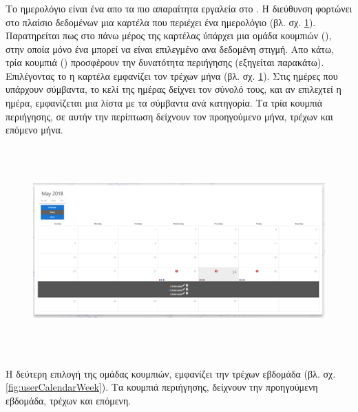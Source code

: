 \subsubsection*{}
\pSpace Το ημερολόγιο είναι ένα απο τα πιο απαραίτητα εργαλεία στο . Η διεύθυνση  φορτώνει στο πλαίσιο δεδομένων μια καρτέλα που περιέχει ένα ημερολόγιο (βλ. σχ. \ref{fig:userCalendar}).\\
\pSpace Παρατηρείται πως στο πάνω μέρος της καρτέλας ύπάρχει μια ομάδα κουμπιών (), στην οποία μόνο ένα μπορεί να είναι επιλεγμένο ανα δεδομένη στιγμή. Απο κάτω, τρία κουμπιά () προσφέρουν την δυνατότητα περιήγησης (εξηγείται παρακάτω).\\
\pSpace Επιλέγοντας το  η καρτέλα εμφανίζει τον τρέχων μήνα (βλ. σχ. \ref{fig:userCalendar}). Στις ημέρες που υπάρχουν σύμβαντα, το κελί της ημέρας δείχνει τον σύνολό τους, και αν επιλεχτεί η ημέρα, εμφανίζεται μια λίστα με τα σύμβαντα ανά κατηγορία. Τα τρία κουμπιά περιήγησης, σε αυτήν την περίπτωση δείχνουν τον προηγούμενο μήνα, τρέχων και επόμενο μήνα.

\begin{figure}[!htb]
\includegraphics[width=\columnwidth, height=8cm]{images/userCalendar.png}
\caption{}
\label{fig:userCalendar}
\end{figure}

\pagebreak

\pSpace Η δεύτερη επιλογή της ομάδας κουμπιών, εμφανίζει την τρέχων εβδομάδα (βλ. σχ. \ref{fig:userCalendarWeek}). Τα κουμπιά περιήγησης, δείχνουν την προηγούμενη εβδομάδα, τρέχων και επόμενη.

